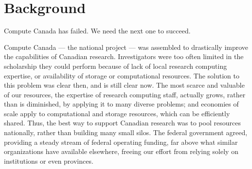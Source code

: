 \documentclass[11pt]{article}
\title{\Title}
\author{\Author}
\date{\Date}
\begin{document}
\begin{titlepage}
\maketitle
\end{titlepage}

\linespread{1.15} 

\begin{executive}

\end{executive}

\section*{Background}

Compute Canada has failed.  We need the next one to succeed.

Compute Canada --- the national project --- was assembled to
drastically improve the capabilities of Canadian research.
Investigators were too often limited in the scholarship they could
perform because of lack of local research computing expertise, or
availability of storage or computational resources.  The solution
to this problem was clear then, and is still clear now.  The most
scarce and valuable of our resources, the expertise of research
computing staff, actually grows, rather than is diminished, by
applying it to many diverse problems; and economies of scale apply
to computational and storage resources, which can be efficiently
shared. Thus, the best way to support Canadian research was to pool
resources nationally, rather than building many small silos. The
federal government agreed, providing a steady stream of federal
operating funding, far above what similar organizations have available
elsewhere, freeing our effort from relying solely on institutions
or even provinces.
\end{document}
